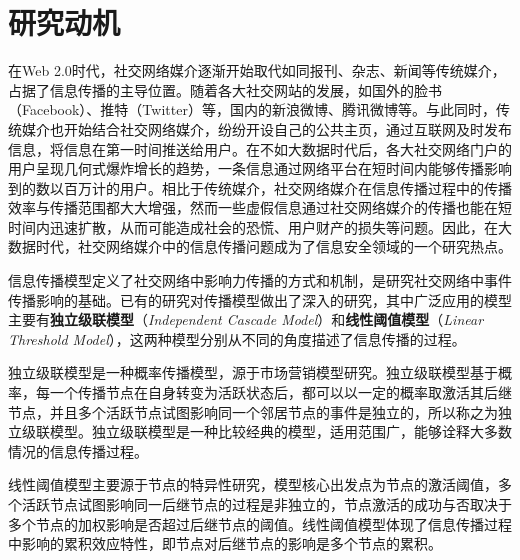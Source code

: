 \section{研究动机}
\label{sec5:motivation}
在Web 2.0时代，社交网络媒介逐渐开始取代如同报刊、杂志、新闻等传统媒介，占据了信息传播的主导位置。随着各大社交网站的发展，如国外的脸书（Facebook）、推特（Twitter）等，国内的新浪微博、腾讯微博等。与此同时，传统媒介也开始结合社交网络媒介，纷纷开设自己的公共主页，通过互联网及时发布信息，将信息在第一时间推送给用户。在不如大数据时代后，各大社交网络门户的用户呈现几何式爆炸增长的趋势，一条信息通过网络平台在短时间内能够传播影响到的数以百万计的用户。相比于传统媒介，社交网络媒介在信息传播过程中的传播效率与传播范围都大大增强，然而一些虚假信息通过社交网络媒介的传播也能在短时间内迅速扩散，从而可能造成社会的恐慌、用户财产的损失等问题。因此，在大数据时代，社交网络媒介中的信息传播问题成为了信息安全领域的一个研究热点。

信息传播模型定义了社交网络中影响力传播的方式和机制，是研究社交网络中事件传播影响的基础。已有的研究对传播模型做出了深入的研究，其中广泛应用的模型主要有\textbf{独立级联模型}（\textit{Independent Cascade Model}）和\textbf{线性阈值模型}（\textit{Linear Threshold Model}），这两种模型分别从不同的角度描述了信息传播的过程。

独立级联模型是一种概率传播模型，源于市场营销模型研究。独立级联模型基于概率，每一个传播节点在自身转变为活跃状态后，都可以以一定的概率取激活其后继节点，并且多个活跃节点试图影响同一个邻居节点的事件是独立的，所以称之为独立级联模型。独立级联模型是一种比较经典的模型，适用范围广，能够诠释大多数情况的信息传播过程。

线性阈值模型主要源于节点的特异性研究，模型核心出发点为节点的激活阈值，多个活跃节点试图影响同一后继节点的过程是非独立的，节点激活的成功与否取决于多个节点的加权影响是否超过后继节点的阈值。线性阈值模型体现了信息传播过程中影响的累积效应特性，即节点对后继节点的影响是多个节点的累积。

